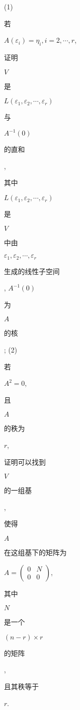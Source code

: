 \documentclass[10pt]{article}
\begin{document}
(1) \begin{CJK}{UTF8}{mj}若\end{CJK} $A\left(\varepsilon_{i}\right)=\eta_{i}, i=2, \cdots, r$, \begin{CJK}{UTF8}{mj}证明\end{CJK} $V$ \begin{CJK}{UTF8}{mj}是\end{CJK} $L\left(\varepsilon_{1}, \varepsilon_{2}, \cdots, \varepsilon_{r}\right)$ \begin{CJK}{UTF8}{mj}与\end{CJK} $A^{-1}(0)$ \begin{CJK}{UTF8}{mj}的直和\end{CJK}, \begin{CJK}{UTF8}{mj}其中\end{CJK} $L\left(\varepsilon_{1}, \varepsilon_{2}, \cdots, \varepsilon_{r}\right)$ \begin{CJK}{UTF8}{mj}是\end{CJK} $V$ \begin{CJK}{UTF8}{mj}中由\end{CJK} $\varepsilon_{1}, \varepsilon_{2}, \cdots, \varepsilon_{r}$ \begin{CJK}{UTF8}{mj}生成的线性子空间\end{CJK}, $A^{-1}(0)$ \begin{CJK}{UTF8}{mj}为\end{CJK} $A$ \begin{CJK}{UTF8}{mj}的核\end{CJK}; (2) \begin{CJK}{UTF8}{mj}若\end{CJK} $A^{2}=0$, \begin{CJK}{UTF8}{mj}且\end{CJK} $A$ \begin{CJK}{UTF8}{mj}的秩为\end{CJK} $r$, \begin{CJK}{UTF8}{mj}证明可以找到\end{CJK} $V$ \begin{CJK}{UTF8}{mj}的一组基\end{CJK}, \begin{CJK}{UTF8}{mj}使得\end{CJK} $A$ \begin{CJK}{UTF8}{mj}在这组基下的矩阵为\end{CJK} $A=\left(\begin{array}{cc}0 & N \\ 0 & 0\end{array}\right)$, \begin{CJK}{UTF8}{mj}其中\end{CJK} $N$ \begin{CJK}{UTF8}{mj}是一个\end{CJK} $(n-r) \times r$ \begin{CJK}{UTF8}{mj}的矩阵\end{CJK}, \begin{CJK}{UTF8}{mj}且其秩等于\end{CJK} $r$.
\end{document}
